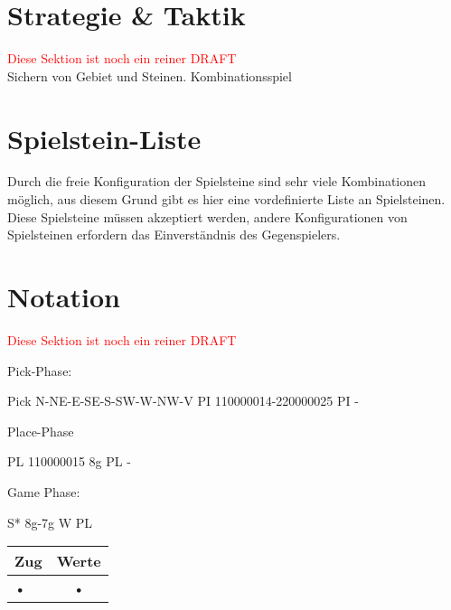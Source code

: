 \documentclass{article}
\begin{document}
\section{Strategie \& Taktik}
	\textcolor{red}{Diese Sektion ist noch ein reiner DRAFT}\\
	
	Sichern von Gebiet und Steinen.
	Kombinationsspiel
	
	
	

\section{Spielstein-Liste}
	
	Durch die freie Konfiguration der Spielsteine sind sehr viele Kombinationen möglich, 
	aus diesem Grund gibt es hier eine vordefinierte Liste an Spielsteinen. Diese Spielsteine
	müssen akzeptiert werden, andere Konfigurationen von Spielsteinen erfordern das Einverständnis
	des Gegenspielers.
	
%	
	

\section{Notation}

\textcolor{red}{Diese Sektion ist noch ein reiner DRAFT}


Pick-Phase:

Pick N-NE-E-SE-S-SW-W-NW-V
PI 110000014-220000025
PI - 

Place-Phase
 
PL 110000015 8g
PL -

Game Phase:

S* 8g-7g
W 
PL

\begin{tabular}{|l|c||}
\hline Zug & Werte \\ \hline
• & • \\  
\end{tabular} 
\end{document}
